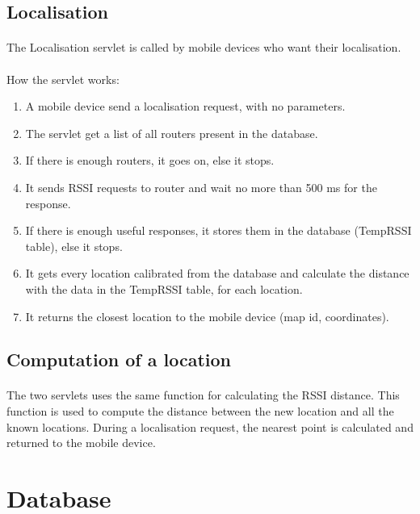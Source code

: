         \subsection{Localisation}

\paragraph{}
The Localisation servlet is called by mobile devices who want their
localisation.

\paragraph{}
How the servlet works:
\begin{enumerate}
    \item A mobile device send a localisation request, with no parameters.
    \item The servlet get a list of all routers present in the database.
    \item If there is enough routers, it goes on, else it stops.
    \item It sends RSSI requests to router and wait no more than 500 ms for the
        response.
    \item If there is enough useful responses, it stores them in the database
        (TempRSSI table), else it stops.
    \item It gets every location calibrated from the database and calculate the
        distance with the data in the TempRSSI table, for each location.
    \item It returns the closest location to the mobile device (map id,
        coordinates).
\end{enumerate}


    \subsection{Computation of a location}

\paragraph{}
The two servlets uses the same function for calculating the RSSI distance. This
function is used to compute the distance between the new location and all the
known locations. During a localisation request, the nearest point is calculated
and returned to the mobile device.

    \section{Database}

